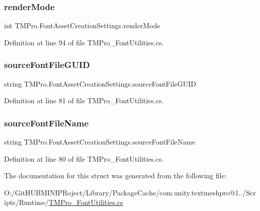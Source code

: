 \subsubsection{\texorpdfstring{renderMode}{renderMode}}
{\footnotesize\ttfamily int T\+M\+Pro.\+Font\+Asset\+Creation\+Settings.\+render\+Mode}



Definition at line 94 of file T\+M\+Pro\+\_\+\+Font\+Utilities.\+cs.

\mbox{\label{struct_t_m_pro_1_1_font_asset_creation_settings_a07c8faf8e4d29ad094d00bb13055b3dd}} 
\subsubsection{\texorpdfstring{sourceFontFileGUID}{sourceFontFileGUID}}
{\footnotesize\ttfamily string T\+M\+Pro.\+Font\+Asset\+Creation\+Settings.\+source\+Font\+File\+G\+U\+ID}



Definition at line 81 of file T\+M\+Pro\+\_\+\+Font\+Utilities.\+cs.

\mbox{\label{struct_t_m_pro_1_1_font_asset_creation_settings_ad6a59cfd2d18f616e4ac8596bd8136b7}} 
\subsubsection{\texorpdfstring{sourceFontFileName}{sourceFontFileName}}
{\footnotesize\ttfamily string T\+M\+Pro.\+Font\+Asset\+Creation\+Settings.\+source\+Font\+File\+Name}



Definition at line 80 of file T\+M\+Pro\+\_\+\+Font\+Utilities.\+cs.



The documentation for this struct was generated from the following file\+:\begin{DoxyCompactItemize}
\item 
O\+:/\+Git\+H\+U\+B\+M\+I\+N\+I\+P\+Roject/\+Library/\+Package\+Cache/com.\+unity.\+textmeshpro@1../\+Scripts/\+Runtime/\mbox{\hyperlink{_t_m_pro___font_utilities_8cs}{T\+M\+Pro\+\_\+\+Font\+Utilities.\+cs}}\end{DoxyCompactItemize}
